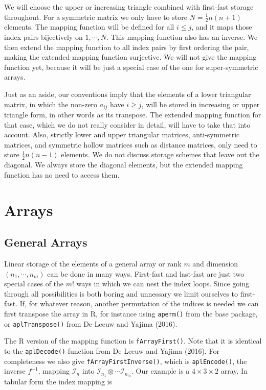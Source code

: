 \documentclass[12pt,]{article}
\begin{document}
We will choose the upper or increasing triangle combined with first-fast
storage throughout. For a symmetric matrix we only have to store
\(N=\frac12 n(n+1)\) elements. The mapping function will be defined for
all \(i\leq j\), and it maps those index pairs bijectively on
\(1,\cdots,N\). This mapping function also has an inverse. We then
extend the mapping function to all index pairs by first ordering the
pair, making the extended mapping function surjective. We will not give
the mapping function yet, because it will be just a special case of the
one for super-symmetric arrays.

Just as an aside, our conventions imply that the elements of a lower
triangular matrix, in which the non-zero \(a_{ij}\) have \(i\geq j\),
will be stored in increasing or upper triangle form, in other words as
its transpose. The extended mapping function for that case, which we do
not really consider in detail, will have to take that into account.
Also, strictly lower and upper triangular matrices, anti-symmetric
matrices, and symmetric hollow matrices such as distance matrices, only
need to store \(\frac12 n(n-1)\) elements. We do not discuss storage
schemes that leave out the diagonal. We always store the diagonal
elements, but the extended mapping function has no need to access them.

\section{Arrays}\label{arrays}

\subsection{General Arrays}\label{general-arrays}

Linear storage of the elements of a general array or rank \(m\) and
dimension \((n_1,\cdots,n_m)\) can be done in many ways. First-fast and
last-fast are just two special cases of the \(m!\) ways in which we can
nest the index loops. Since going through all possibilities is both
boring and unnessary we limit ourselves to first-fast. If, for whatever
reason, another permutation of the indices is needed we can first
transpose the array in R, for instance using \texttt{aperm()} from the
base package, or \texttt{aplTranspose()} from De Leeuw and Yajima
(2016).

The R version of the mapping function is \texttt{fArrayFirst()}. Note
that it is identical to the \texttt{aplDecode()} function from De Leeuw
and Yajima (2016). For completeness we also give
\texttt{fArrayFirstInverse()}, which is \texttt{aplEncode()}, the
inverse \(f^{-1}\), mapping \(\mathcal{I}_n\) into
\(\mathcal{I}_{n_1}\otimes\cdots\mathcal{I}_{n_m}\). Our example is a
\(4\times 3\times 2\) array. In tabular form the index mapping is
\end{document}
